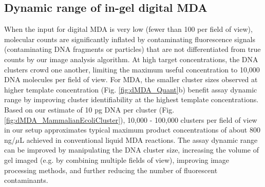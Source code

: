 \subsection{Dynamic range of in-gel digital MDA}
When the input for digital MDA is very low (fewer than 100 per field of view), molecular counts are significantly inflated by contaminating fluorescence signals (contaminating DNA fragments or particles) that are not differentiated from true counts by our image analysis algorithm. At high target concentrations, the DNA clusters crowd one another, limiting the maximum useful concentration to 10,000 DNA molecules per field of view. For MDA, the smaller cluster sizes observed at higher template concentration (Fig. \ref{fig:dMDA_Quant}b) benefit assay dynamic range by improving cluster identifiability at the highest template concentrations. Based on our estimate of 10 pg DNA per cluster (Fig. \ref{fig:dMDA_MammalianEcoliCluster}), 10,000 - 100,000 clusters per field of view in our setup approximates typical maximum product concentrations of about 800 ng\slash $\mu$L achieved in conventional liquid MDA reactions. The assay dynamic range can be improved by manipulating the DNA cluster size, increasing the volume of gel imaged (e.g. by combining multiple fields of view), improving image processing methods, and further reducing the number of fluorescent contaminants. 

